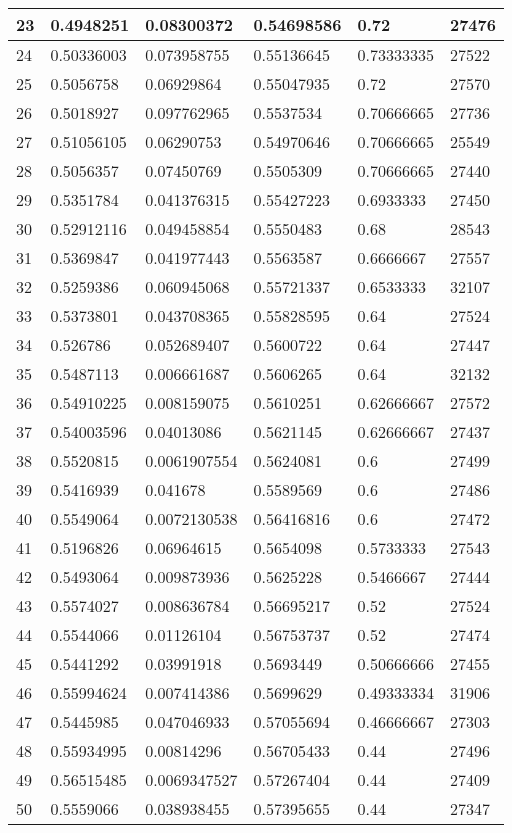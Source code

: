 \begin{longtable}{|l|l|l|l|l|l|}
23 & 0.4948251 & 0.08300372 & 0.54698586 & 0.72 & 27476 \\ \hline 
24 & 0.50336003 & 0.073958755 & 0.55136645 & 0.73333335 & 27522 \\ \hline 
25 & 0.5056758 & 0.06929864 & 0.55047935 & 0.72 & 27570 \\ \hline 
26 & 0.5018927 & 0.097762965 & 0.5537534 & 0.70666665 & 27736 \\ \hline 
27 & 0.51056105 & 0.06290753 & 0.54970646 & 0.70666665 & 25549 \\ \hline 
28 & 0.5056357 & 0.07450769 & 0.5505309 & 0.70666665 & 27440 \\ \hline 
29 & 0.5351784 & 0.041376315 & 0.55427223 & 0.6933333 & 27450 \\ \hline 
30 & 0.52912116 & 0.049458854 & 0.5550483 & 0.68 & 28543 \\ \hline 
31 & 0.5369847 & 0.041977443 & 0.5563587 & 0.6666667 & 27557 \\ \hline 
32 & 0.5259386 & 0.060945068 & 0.55721337 & 0.6533333 & 32107 \\ \hline 
33 & 0.5373801 & 0.043708365 & 0.55828595 & 0.64 & 27524 \\ \hline 
34 & 0.526786 & 0.052689407 & 0.5600722 & 0.64 & 27447 \\ \hline 
35 & 0.5487113 & 0.006661687 & 0.5606265 & 0.64 & 32132 \\ \hline 
36 & 0.54910225 & 0.008159075 & 0.5610251 & 0.62666667 & 27572 \\ \hline 
37 & 0.54003596 & 0.04013086 & 0.5621145 & 0.62666667 & 27437 \\ \hline 
38 & 0.5520815 & 0.0061907554 & 0.5624081 & 0.6 & 27499 \\ \hline 
39 & 0.5416939 & 0.041678 & 0.5589569 & 0.6 & 27486 \\ \hline 
40 & 0.5549064 & 0.0072130538 & 0.56416816 & 0.6 & 27472 \\ \hline 
41 & 0.5196826 & 0.06964615 & 0.5654098 & 0.5733333 & 27543 \\ \hline 
42 & 0.5493064 & 0.009873936 & 0.5625228 & 0.5466667 & 27444 \\ \hline 
43 & 0.5574027 & 0.008636784 & 0.56695217 & 0.52 & 27524 \\ \hline 
44 & 0.5544066 & 0.01126104 & 0.56753737 & 0.52 & 27474 \\ \hline 
45 & 0.5441292 & 0.03991918 & 0.5693449 & 0.50666666 & 27455 \\ \hline 
46 & 0.55994624 & 0.007414386 & 0.5699629 & 0.49333334 & 31906 \\ \hline 
47 & 0.5445985 & 0.047046933 & 0.57055694 & 0.46666667 & 27303 \\ \hline 
48 & 0.55934995 & 0.00814296 & 0.56705433 & 0.44 & 27496 \\ \hline 
49 & 0.56515485 & 0.0069347527 & 0.57267404 & 0.44 & 27409 \\ \hline 
50 & 0.5559066 & 0.038938455 & 0.57395655 & 0.44 & 27347 \\ \hline 
\end{longtable}